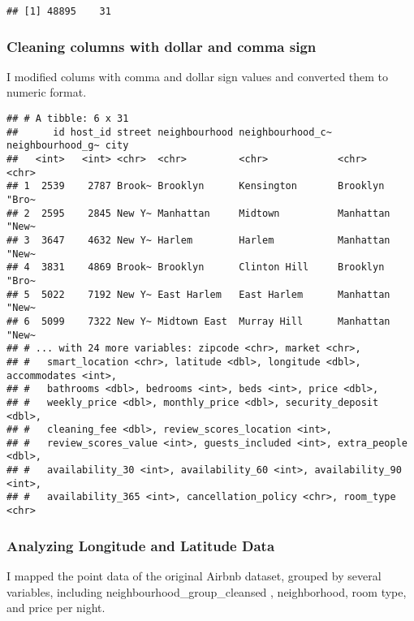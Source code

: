 \documentclass[
]{article}
\begin{document}
\begin{verbatim}
## [1] 48895    31
\end{verbatim}

\hypertarget{cleaning-columns-with-dollar-and-comma-sign}{%
\subsubsection{Cleaning columns with dollar and comma
sign}\label{cleaning-columns-with-dollar-and-comma-sign}}

I modified colums with comma and dollar sign values and converted them
to numeric format.

\begin{verbatim}
## # A tibble: 6 x 31
##      id host_id street neighbourhood neighbourhood_c~ neighbourhood_g~ city 
##   <int>   <int> <chr>  <chr>         <chr>            <chr>            <chr>
## 1  2539    2787 Brook~ Brooklyn      Kensington       Brooklyn         "Bro~
## 2  2595    2845 New Y~ Manhattan     Midtown          Manhattan        "New~
## 3  3647    4632 New Y~ Harlem        Harlem           Manhattan        "New~
## 4  3831    4869 Brook~ Brooklyn      Clinton Hill     Brooklyn         "Bro~
## 5  5022    7192 New Y~ East Harlem   East Harlem      Manhattan        "New~
## 6  5099    7322 New Y~ Midtown East  Murray Hill      Manhattan        "New~
## # ... with 24 more variables: zipcode <chr>, market <chr>,
## #   smart_location <chr>, latitude <dbl>, longitude <dbl>, accommodates <int>,
## #   bathrooms <dbl>, bedrooms <int>, beds <int>, price <dbl>,
## #   weekly_price <dbl>, monthly_price <dbl>, security_deposit <dbl>,
## #   cleaning_fee <dbl>, review_scores_location <int>,
## #   review_scores_value <int>, guests_included <int>, extra_people <dbl>,
## #   availability_30 <int>, availability_60 <int>, availability_90 <int>,
## #   availability_365 <int>, cancellation_policy <chr>, room_type <chr>
\end{verbatim}

\hypertarget{analyzing-longitude-and-latitude-data}{%
\subsubsection{Analyzing Longitude and Latitude
Data}\label{analyzing-longitude-and-latitude-data}}

I mapped the point data of the original Airbnb dataset, grouped by
several variables, including neighbourhood\_group\_cleansed ,
neighborhood, room type, and price per night.
\end{document}

